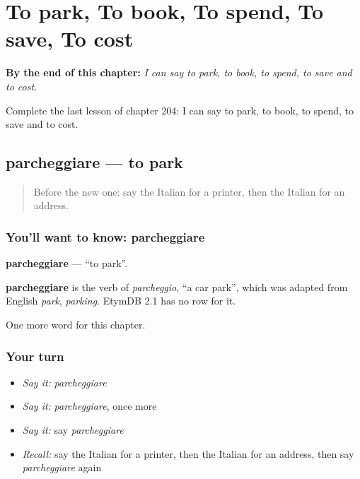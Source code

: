 
\chapter{To park, To book, To spend, To save, To cost}
\label{ch:it-to-park-to-book-to-spend-to-save-to-cost}

\begin{chapteropening}
\textbf{By the end of this chapter:} \emph{I can say to park, to book, to spend, to save and to cost.}

Complete the last lesson of chapter 204: I can say to park, to book, to spend, to save and to cost.
\end{chapteropening}

\section[parcheggiare]{parcheggiare — to park}

\label{lesson:IT-C204-parcheggiare}



\begin{quote}
Before the new one: say the Italian for a printer, then the Italian for an address.
\end{quote}

\subsection*{You'll want to know: parcheggiare}
\textbf{parcheggiare} — \textquotedblleft{}to park\textquotedblright{}.

\begin{cousinweb}
\textbf{parcheggiare} is the verb of \emph{parcheggio}, \textquotedblleft{}a car park\textquotedblright{}, which was adapted from English \emph{park}, \emph{parking}. EtymDB 2.1 has no row for it.
\end{cousinweb}

\begin{grammarlens}[title={What you've built}]
One more word for this chapter.
\end{grammarlens}

\subsection*{Your turn}
\begin{itemize}
\raggedright
  \item \emph{Say it:} \emph{parcheggiare}
  \item \emph{Say it:} \emph{parcheggiare}, once more
  \item \emph{Say it:} say \emph{parcheggiare}
  \item \emph{Recall:} say the Italian for a printer, then the Italian for an address, then say \emph{parcheggiare} again
\end{itemize}

